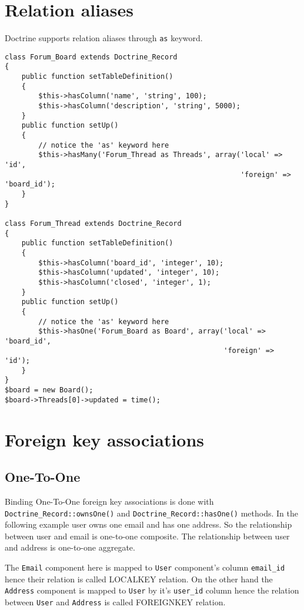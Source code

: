 \documentclass[11pt,a4paper]{report}
\begin{document}
\section{Relation aliases}
Doctrine supports relation aliases through \texttt{as} keyword.

\begin{verbatim}
class Forum_Board extends Doctrine_Record
{
    public function setTableDefinition()
    {
        $this->hasColumn('name', 'string', 100);
        $this->hasColumn('description', 'string', 5000);
    }
    public function setUp()
    {
        // notice the 'as' keyword here
        $this->hasMany('Forum_Thread as Threads', array('local' => 'id',
                                                        'foreign' => 'board_id');
    }
}

class Forum_Thread extends Doctrine_Record
{
    public function setTableDefinition()
    {
        $this->hasColumn('board_id', 'integer', 10);
        $this->hasColumn('updated', 'integer', 10);
        $this->hasColumn('closed', 'integer', 1);
    }
    public function setUp()
    {
        // notice the 'as' keyword here
        $this->hasOne('Forum_Board as Board', array('local' => 'board_id',
                                                    'foreign' => 'id');
    }
}
$board = new Board();
$board->Threads[0]->updated = time();
\end{verbatim}

\section{Foreign key associations}
\subsection{One-To-One}
Binding One-To-One foreign key associations is done with \texttt{Doctrine\_Record::ownsOne()} and \texttt{Doctrine\_Record::hasOne()} methods. In the following example user owns one email and has one address. So the relationship between user and email is one-to-one composite. The relationship between user and address is one-to-one aggregate.

The \texttt{Email} component here is mapped to \texttt{User} component's column \texttt{email\_id} hence their relation is called LOCALKEY relation. On the other hand the \texttt{Address} component is mapped to \texttt{User} by it's \texttt{user\_id} column hence the relation between \texttt{User} and \texttt{Address} is called FOREIGNKEY relation.
\end{document}
